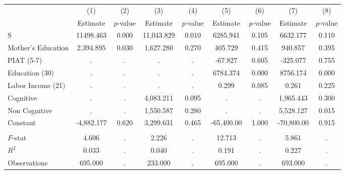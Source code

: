 \begin{tabular}{lcccccccc} \toprule
 & (1) & (2) & (3) & (4) & (5) & (6) & (7) & (8) \\ 
 & Estimate  & $p$-value  & Estimate  & $p$-value  & Estimate  & $p$-value  & Estimate  & $p$-value  \\  \midrule
S & 11498.463 &     0.000 & 11,043.829 &     0.010 &  6285.941 &     0.105 &  6632.177 &     0.110 \\  
Mother's Education &  2,394.895 &     0.030 &  1,627.280 &     0.270 &   405.729 &     0.415 &   940.857 &     0.395 \\  
PIAT (5-7) &         . &         . &         . &         . &   -67.827 &     0.605 &  -325.077 &     0.755 \\  
Education (30) &         . &         . &         . &         . &  6784.374 &     0.000 &  8756.174 &     0.000 \\  
Labor Income (21) &         . &         . &         . &         . &     0.299 &     0.085 &     0.261 &     0.225 \\  
Cognitive &         . &         . &  4,083.211 &     0.095 &         . &         . &  1,965.443 &     0.300 \\  
Non Cognitive &         . &         . &  1,550.587 &     0.280 &         . &         . &  5,528.127 &     0.015 \\  
Constant & -4,882.177 &     0.620 &  3,299.631 &     0.465 & -65,400.00 &     1.000 & -70,800.00 &     0.915 \\ \\ \midrule  
$F$-stat &     4.606 &         . &     2.226 &         . &    12.713 &         . &     5.861 &         . \\  
$R^2$ &     0.033 &         . &     0.040 &         . &     0.191 &         . &     0.227 &         . \\  
Observations &   695.000 &         . &   233.000 &         . &   695.000 &         . &   693.000 &         . \\  
\bottomrule \end{tabular}
